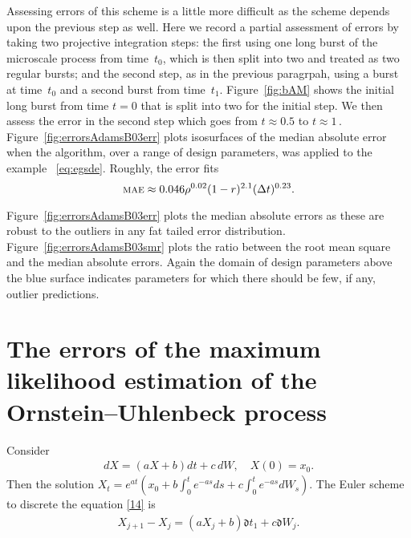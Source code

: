 \documentclass[12pt,reqno, a4paper]{article}
\numberwithin{equation}{section}
\newcommand{\err}{\operatorname{\textsc{mae}}}%
\begin{document}
Assessing errors of this scheme is a little more difficult as the scheme depends upon the previous step as well.  Here we record a partial assessment of errors by taking two projective integration steps: the first using one long burst of the microscale process from time~$t_0$, which is then split into two and treated as two regular bursts; and the second step, as in the previous paragrpah, using a burst at time~$t_0$ and a second burst from time~$t_1$. Figure~\ref{fig:bAM} shows the initial long burst from time $t=0$ that is split into two for the initial step.  We then assess the error in the second step which goes from $t\approx0.5$ to $t\approx 1$\,. Figure~\ref{fig:errorsAdamsB03err} plots isosurfaces of the median absolute error when the algorithm, over a range of design parameters, was applied to the example ~\eqref{eq:egsde}. Roughly, the error fits
\begin{equation}
\err\approx 0.046\rho^{0.02}(1-r)^{2.1}(\Delta t)^{0.23}.
\label{eq:amerr}
\end{equation}

Figure~\ref{fig:errorsAdamsB03err} plots the median absolute errors as these are robust to the outliers in any fat tailed error distribution.  Figure~\ref{fig:errorsAdamsB03smr} plots the ratio between the root mean square and the median absolute errors.  Again the domain of design parameters above the blue surface indicates parameters for which there should be few, if any, outlier predictions. %






\section{The errors of the maximum likelihood estimation of the Ornstein--Uhlenbeck process}
 Consider
\begin{eqnarray*}
dX=(aX+b)dt+c\,dW,   \quad  X(0)=x_0.
\end{eqnarray*}
Then the solution
$X_t=e^{at}(x_0+b\int _0^te^{-as}ds+c\int _0^te^{-as}dW_s)$.
The Euler scheme to discrete the equation \eqref{14} is
\begin{eqnarray*}
X_{j+1}-X_j=(a X_j+b)\mathfrak{d} t_1+c\mathfrak{d} W_j.\end{eqnarray*}
\end{document}
